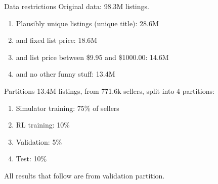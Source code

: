 \documentclass[aspectratio=169]{beamer}
\begin{document}

\begin{frame}{Data restrictions}
	Original data: 98.3M listings.\pause
	\begin{enumerate}
		\item Plausibly unique listings (unique title): 28.6M\pause
		\item and fixed list price: 18.6M\pause
		\item and list price between \$9.95 and \$1000.00: 14.6M\pause
		\item and no other funny stuff: 13.4M
	\end{enumerate}
\end{frame}

\begin{frame}{Partitions}
	13.4M listings, from 771.6k sellers, split into 4 partitions:
	\begin{enumerate}
		\item Simulator training: 75\% of sellers
		\item RL training: 10\%
		\item Validation: 5\%
		\item Test: 10\%
	\end{enumerate}
	\vspace{5mm}
	All results that follow are from validation partition.
\end{frame}
\end{document}
